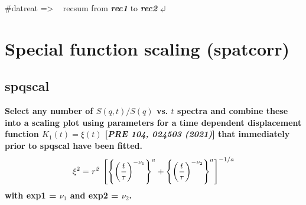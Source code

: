 \documentclass[11pt,fleqn]{book} %
\newcommand{\return}{$\carriagereturn$} %
\newcommand{\sysprompt}{{\color{green}...\textgreater} ~ }
\newcommand{\dtrprompt}{{\color{blue}\#datreat =\textgreater} ~ }
\newcommand{\enter}[1]{{\color{red} \bf #1}}
\newcommand{\var}[1]{{\color{red} \bf \it #1}}
\begin{document}
\begin{corollary}
\dtrprompt recsum from \var{rec1} to \var{rec2}   \return 
\end{corollary}

 


\chapter{Special function scaling (spatcorr)}



\section{spqscal}
\vskip 1cm

\begin{exercise}
\bf
Select any number of $S(q,t)/S(q)$ vs. $t$ spectra and combine these into a scaling plot using
parameters for a time dependent displacement function ${K_1(t)=\xi(t)}$ [{\it PRE  104, 024503 (2021)}]  
that immediately prior to \textbf{ spqscal} have been fitted. 
\begin{equation}
\xi^2 = 
{\it r^2}\, \left[  \left\{  \left( {\frac {t}{\tau}} \right) ^{-\nu_1}
 \right\} ^{a}+ \left\{  \left( {\frac {t}{\tau}} \right) ^{-\nu_2}
 \right\} ^{a} \right] ^{-{1/a}}
\end{equation}
with exp1 = ${\nu_1}$ and exp2 = ${\nu_2}$.
\end{exercise}
\end{document}
